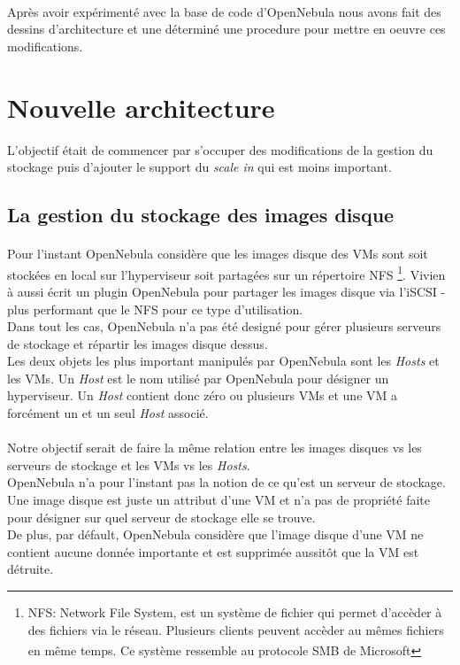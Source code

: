 \paragraph*{}
Après avoir expérimenté avec la base de code d'OpenNebula nous avons fait des dessins d'architecture et une déterminé une procedure pour mettre en oeuvre ces
modifications.


\section{Nouvelle architecture}

L'objectif était de commencer par s'occuper des modifications de la gestion du stockage puis d'ajouter le support du \emph{scale in} qui est moins important.

\subsection{La gestion du stockage des images disque}
\paragraph*{}
Pour l'instant OpenNebula considère que les images disque des VMs sont soit stockées en local sur l'hyperviseur soit partagées sur un répertoire NFS
	\footnote{NFS: Network File System, est un système de fichier qui permet d'accèder à des fichiers via le réseau. Plusieurs clients peuvent accèder
	au mêmes fichiers en même temps. Ce système ressemble au protocole SMB de Microsoft\textsuperscript{\textregistered}}.
Vivien à aussi écrit un plugin OpenNebula pour partager les images disque via l'iSCSI - plus performant que le NFS pour ce type d'utilisation.
\\
Dans tout les cas, OpenNebula n'a pas été designé pour gérer plusieurs serveurs de stockage et répartir les images disque dessus.
\\
Les deux objets les plus important manipulés par OpenNebula sont les \emph{Hosts} et les VMs. Un \emph{Host} est le nom utilisé par OpenNebula pour
désigner un hyperviseur.
Un \emph{Host} contient donc zéro ou plusieurs VMs et une VM a forcément un et un seul \emph{Host} associé.


\paragraph*{}
Notre objectif serait de faire la même relation entre les images disques vs les serveurs de stockage et les VMs vs les \emph{Hosts}.
\\
OpenNebula n'a pour l'instant pas la notion de ce qu'est un serveur de stockage. Une image disque est juste un attribut d'une VM et n'a
pas de propriété faite pour désigner sur quel serveur de stockage elle se trouve.\\
De plus, par défault, OpenNebula considère que l'image disque d'une VM ne contient aucune donnée importante et est supprimée aussitôt
que la VM est détruite.

